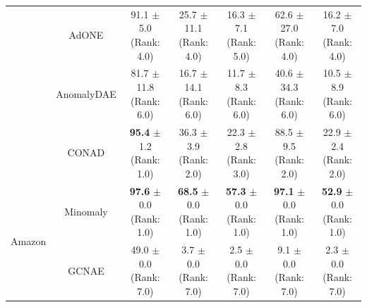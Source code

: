 \begin{table}[htbp]
{\begin{tabular}{|l|c|c|c|c|c|c|}
    & AdONE & \makecell{91.1 $\pm$ 5.0 \\[1pt] \tiny (Rank: 4.0)} & \makecell{25.7 $\pm$ 11.1 \\[1pt] \tiny (Rank: 4.0)} & \makecell{16.3 $\pm$ 7.1 \\[1pt] \tiny (Rank: 5.0)} & \makecell{62.6 $\pm$ 27.0 \\[1pt] \tiny (Rank: 4.0)} & \makecell{16.2 $\pm$ 7.0 \\[1pt] \tiny (Rank: 4.0)} \\
    & AnomalyDAE & \makecell{81.7 $\pm$ 11.8 \\[1pt] \tiny (Rank: 6.0)} & \makecell{16.7 $\pm$ 14.1 \\[1pt] \tiny (Rank: 6.0)} & \makecell{11.7 $\pm$ 8.3 \\[1pt] \tiny (Rank: 6.0)} & \makecell{40.6 $\pm$ 34.3 \\[1pt] \tiny (Rank: 6.0)} & \makecell{10.5 $\pm$ 8.9 \\[1pt] \tiny (Rank: 6.0)} \\
    & CONAD & \makecell{\textbf{95.4} $\pm$ 1.2 \\[1pt] \tiny (Rank: 1.0)} & \makecell{36.3 $\pm$ 3.9 \\[1pt] \tiny (Rank: 2.0)} & \makecell{22.3 $\pm$ 2.8 \\[1pt] \tiny (Rank: 3.0)} & \makecell{88.5 $\pm$ 9.5 \\[1pt] \tiny (Rank: 2.0)} & \makecell{22.9 $\pm$ 2.4 \\[1pt] \tiny (Rank: 2.0)} \\ \hline
    \multirow{7}{*}{Amazon}
    & Minomaly & \makecell{\textbf{97.6} $\pm$ 0.0 \\[1pt] \tiny (Rank: 1.0)} & \makecell{\textbf{68.5} $\pm$ 0.0 \\[1pt] \tiny (Rank: 1.0)} & \makecell{\textbf{57.3} $\pm$ 0.0 \\[1pt] \tiny (Rank: 1.0)} & \makecell{\textbf{97.1} $\pm$ 0.0 \\[1pt] \tiny (Rank: 1.0)} & \makecell{\textbf{52.9} $\pm$ 0.0 \\[1pt] \tiny (Rank: 1.0)} \\
    & GCNAE & \makecell{49.0 $\pm$ 0.0 \\[1pt] \tiny (Rank: 7.0)} & \makecell{3.7 $\pm$ 0.0 \\[1pt] \tiny (Rank: 7.0)} & \makecell{2.5 $\pm$ 0.0 \\[1pt] \tiny (Rank: 7.0)} & \makecell{9.1 $\pm$ 0.0 \\[1pt] \tiny (Rank: 7.0)} & \makecell{2.3 $\pm$ 0.0 \\[1pt] \tiny (Rank: 7.0)} \\

\end{tabular}}
\end{table}

